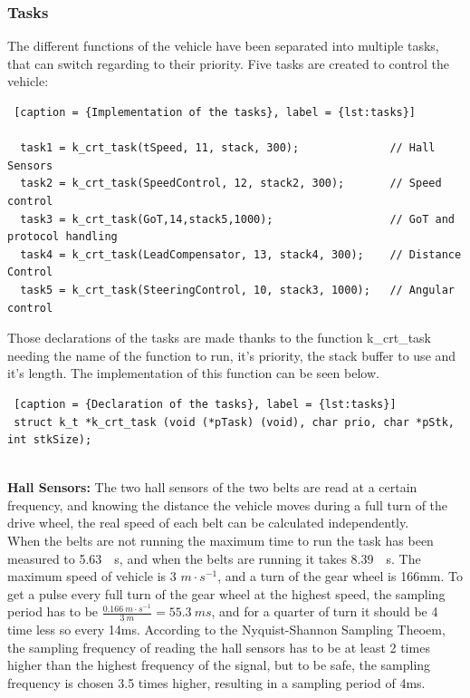 \subsubsection{Tasks}
The different functions of the vehicle have been separated into multiple tasks, that can switch regarding to their priority. Five tasks are created to control the vehicle:

\begin{lstlisting} [caption = {Implementation of the tasks}, label = {lst:tasks}]

  task1 = k_crt_task(tSpeed, 11, stack, 300);         	   // Hall Sensors
  task2 = k_crt_task(SpeedControl, 12, stack2, 300); 	   // Speed control
  task3 = k_crt_task(GoT,14,stack5,1000);        		   // GoT and protocol handling
  task4 = k_crt_task(LeadCompensator, 13, stack4, 300);    // Distance Control
  task5 = k_crt_task(SteeringControl, 10, stack3, 1000);   // Angular control

\end{lstlisting}

Those declarations of the tasks are made thanks to the function k\_crt\_task needing the name of the function to run, it's priority, the stack buffer to use and it's length. The implementation of this function can be seen below.


\begin{lstlisting} [caption = {Declaration of the tasks}, label = {lst:tasks}]
 struct k_t *k_crt_task (void (*pTask) (void), char prio, char *pStk, int stkSize);
 
\end{lstlisting}


\textbf{Hall Sensors:}
The two hall sensors of the two belts are read at a certain frequency, and knowing the distance the vehicle moves during a full turn of the drive wheel, the real speed of each belt can be calculated independently.\\
When the belts are not running the maximum time to run the task has been measured to \SI{5.63}{\mu s}, and when the belts are running it takes \SI{8.39}{\mu s}.
The maximum speed of vehicle is 3 $m \cdot s^{-1}$, and a turn of the gear wheel is 166mm. To get a pulse every full turn of the gear wheel at the highest speed, the sampling period has to be $\frac{\SI{0.166}{m\cdot s^{-1}}}{\SI{3}{m}}={\SI{55.3}{ms}}$, and for a quarter of turn it should be 4 time less so every 14ms. According to the Nyquist-Shannon Sampling Theoem, the sampling frequency of reading the hall sensors has to be at least 2 times higher than the highest frequency of the signal, but to be safe, the sampling frequency is chosen \SI{3.5}{} times higher, resulting in a sampling period of 4ms.

